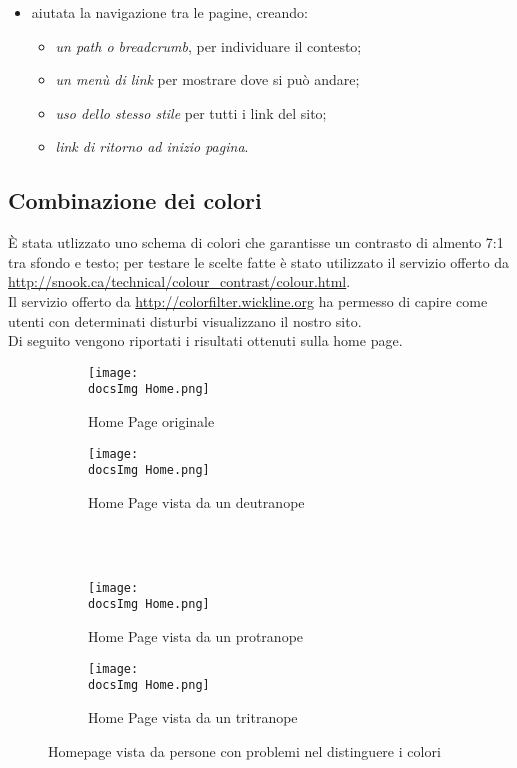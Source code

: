 {{\begin{itemize}
			\item aiutata la navigazione tra le pagine, creando:
			\begin{itemize}\itemsep1pt
				\item \textit{un path o breadcrumb}, per individuare il contesto;
				\item \textit{un menù di link} per mostrare dove si può andare;
				\item \textit{uso dello stesso stile} per tutti i link del sito;
				\item \textit{link di ritorno ad inizio pagina}.
			\end{itemize}
		\end{itemize}
	}
	\subsection{Combinazione dei colori}{
		È stata utlizzato uno schema di colori che garantisse un contrasto di almento 7:1 tra sfondo e testo; per testare le scelte fatte è stato utilizzato il servizio offerto da \url{http://snook.ca/technical/colour_contrast/colour.html}.\\
		Il servizio offerto da \url{http://colorfilter.wickline.org} ha permesso di capire come utenti con determinati disturbi visualizzano il nostro sito.\\
		Di seguito vengono riportati i risultati ottenuti sulla home page.
		\begin{figure}[H]
			\begin{subfigure}[b]{0.5\textwidth}
				\texttt{[image: \\docsImg Home.png]}
				\vspace{-40pt}
				\caption{Home Page originale}
				\label{Home Page originale}
			\end{subfigure}
			\begin{subfigure}[b]{0.5\textwidth}
				\texttt{[image: \\docsImg Home.png]}
				\vspace{-40pt}
				\caption{Home Page vista da un deutranope}
				\label{Home Page vista da un deutranope}
			\end{subfigure}
			\\
			\\
			\begin{subfigure}[b]{0.5\textwidth}
				\texttt{[image: \\docsImg Home.png]}
				\vspace{-40pt}
				\caption{Home Page vista da un protranope}
				\label{Home Page vista da un protranope}
			\end{subfigure}
			\begin{subfigure}[b]{0.5\textwidth}
			\texttt{[image: \\docsImg Home.png]}
				\vspace{-40pt}
				\caption{Home Page vista da un tritranope}
				\label{Home Page vista da un tritranope}
			\end{subfigure}
			\caption{Homepage vista da persone con problemi nel distinguere i colori}
			\label{fig: Homepage vista da persone con problemi nel distinguere i colori}
		\end{figure}
	}
}